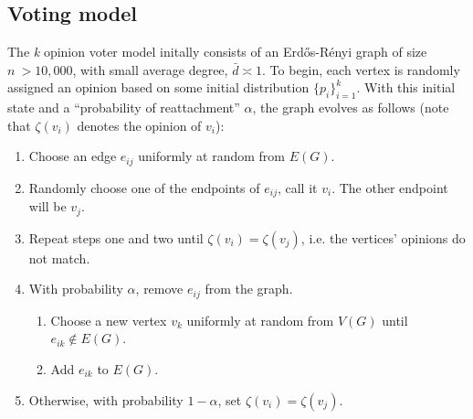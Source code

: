 \documentclass[11pt]{article}
\begin{document}
\subsection{Voting model}
\indent The \textit{k} opinion voter model initally consists of an Erd\H{o}s-R\'{e}nyi graph of size $n \ >10,000$, with small average degree, $\bar{d}\asymp 1$. To begin, each vertex is randomly assigned an opinion based on some initial distribution $\{p_{i}\}_{i=1}^{k}$. With this initial state and a ``probability of reattachment'' $\alpha$, the graph evolves as follows (note that $\zeta(v_{i})$ denotes the opinion of $v_{i}$):
\begin{enumerate}
\item Choose an edge $e_{ij}$ uniformly at random from $E(G)$.
\item Randomly choose one of the endpoints of $e_{ij}$, call it $v_{i}$. The other endpoint will be $v_{j}$.
\item Repeat steps one and two until $\zeta(v_{i}) = \zeta(v_{j})$, i.e. the vertices' opinions do not match.
\item With probability $\alpha$, remove $e_{ij}$ from the graph.
\begin{enumerate}
\item Choose a new vertex $v_{k}$ uniformly at random from $V(G)$ until $e_{ik} \notin E(G)$.
\item Add $e_{ik}$ to $E(G)$.
\end{enumerate}
\item Otherwise, with probability $1-\alpha$, set $\zeta(v_{i}) = \zeta(v_{j})$.
\end{enumerate}
\end{document}
